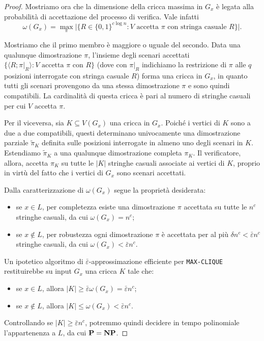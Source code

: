 \begin{proof}
	Mostriamo ora che la dimensione della cricca massima in $G_x$ è legata alla
	probabilità di accettazione del processo di verifica. Vale infatti
	\[
		\omega(G_x) = \max_\pi \bigl| \{ R \in \{0, 1\}^{c \log n} :
		V \text{ accetta } \pi \text{ con stringa casuale } R \} \bigr|.
	\]

	Mostriamo che il primo membro è maggiore o uguale del secondo.
	Data una qualunque dimostrazione $\pi$, l'insieme degli
	scenari accettati
	$\{\langle R; \pi|_R \rangle : V \text{ accetta } \pi \text{ con } R\}$
	(dove con $\pi|_R$ indichiamo la restrizione di $\pi$ alle $q$ posizioni
	interrogate con stringa casuale $R$) forma una cricca in $G_x$,
	in quanto tutti gli scenari provengono da una stessa dimostrazione
	$\pi$ e sono quindi compatibili.
	La cardinalità di questa cricca è pari al numero di stringhe casuali per
	cui $V$ accetta $\pi$.
	
	Per il viceversa, sia $K \subseteq V(G_x)$ una cricca in $G_x$.
	Poiché i vertici di $K$ sono a due a due compatibili, questi
	determinano univocamente una dimostrazione parziale $\tilde{\pi}_K$
	definita sulle posizioni interrogate in almeno uno degli scenari in $K$.
	Estendiamo $\tilde{\pi}_K$ a una qualunque dimostrazione completa
	$\pi_K$. Il verificatore, allora, accetta $\pi_K$ su tutte le
	$|K|$ stringhe casuali associate ai vertici di $K$, proprio in
	virtù del fatto che i vertici di $G_x$ sono scenari accettati.

	Dalla caratterizzazione di $\omega(G_x)$ segue la proprietà desiderata:
	\begin{itemize}
		\item se $x \in L$, per completezza esiste una dimostrazione $\pi$
			accettata su tutte le $n^c$ stringhe casuali, da cui
			$\omega(G_x) = n^c$;
		\item se $x \notin L$, per robustezza ogni dimostrazione $\pi$ è
			accettata per al più $\delta n^c < \bar\varepsilon n^c$ stringhe
			casuali, da cui $\omega(G_x) < \bar\varepsilon n^c$.
	\end{itemize}

	Un ipotetico algoritmo di $\bar\varepsilon$-approssimazione efficiente
	per \texttt{MAX-CLIQUE} restituirebbe su input $G_x$ una cricca $K$
	tale che:
	\begin{itemize}
		\item se $x \in L$, allora $|K| \ge \bar\varepsilon \omega(G_x)
			= \bar\varepsilon n^c$;
		\item se $x \notin L$, allora $|K| \le \omega(G_x) < \bar\varepsilon n^c$.
	\end{itemize}
	Controllando se $|K| \ge \bar\varepsilon n^c$, potremmo quindi decidere in tempo
	polinomiale l'appartenenza a $L$, da cui $\mathbf{P} = \mathbf{NP}$.
\end{proof}

